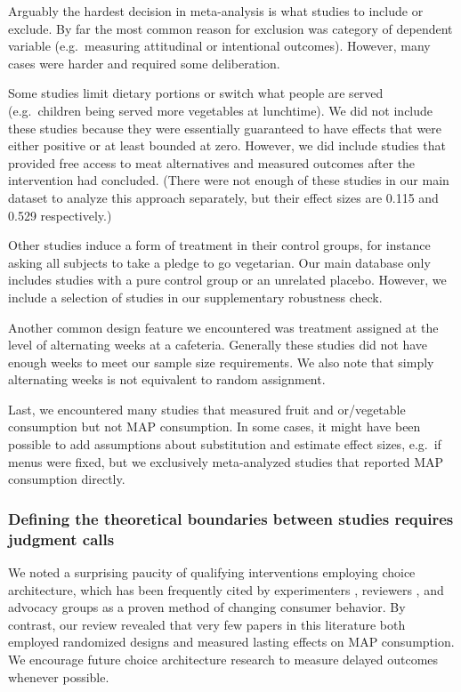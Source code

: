\documentclass[sn-nature,referee,pdflatex]{sn-jnl}
\begin{document}
Arguably the hardest decision in meta-analysis is what studies to
include or exclude. By far the most common reason for exclusion was
category of dependent variable (e.g.~measuring attitudinal or
intentional outcomes). However, many cases were harder and required some
deliberation.

Some studies limit dietary portions or switch what people are served
(e.g.~children being served more vegetables at lunchtime). We did not
include these studies because they were essentially guaranteed to have
effects that were either positive or at least bounded at zero. However,
we did include studies that provided free access to meat alternatives
\citep{acharya2004, bianchi2022} and measured outcomes after the
intervention had concluded. (There were not enough of these studies in
our main dataset to analyze this approach separately, but their effect
sizes are 0.115 and 0.529 respectively.)

Other studies induce a form of treatment in their control groups, for
instance asking all subjects to take a pledge to go vegetarian. Our main
database only includes studies with a pure control group or an unrelated
placebo. However, we include a selection of studies in our supplementary
robustness check.

Another common design feature we encountered was treatment assigned at
the level of alternating weeks at a cafeteria. Generally these studies
did not have enough weeks to meet our sample size requirements. We also
note that simply alternating weeks is not equivalent to random
assignment.

Last, we encountered many studies that measured fruit and or/vegetable
consumption but not MAP consumption. In some cases, it might have been
possible to add assumptions about substitution and estimate effect
sizes, e.g.~if menus were fixed, but we exclusively meta-analyzed
studies that reported MAP consumption directly.

\subsubsection{Defining the theoretical boundaries between studies
requires judgment calls}\label{sec5.4.4}

We noted a surprising paucity of qualifying interventions employing
choice architecture, which has been frequently cited by experimenters
\citep{boronowsky2022}, reviewers \citep{meier2022}, and advocacy groups
\citep{zhang2022} as a proven method of changing consumer behavior. By
contrast, our review revealed that very few papers in this literature
both employed randomized designs and measured lasting effects on MAP
consumption. We encourage future choice architecture research to measure
delayed outcomes whenever possible.
\end{document}
